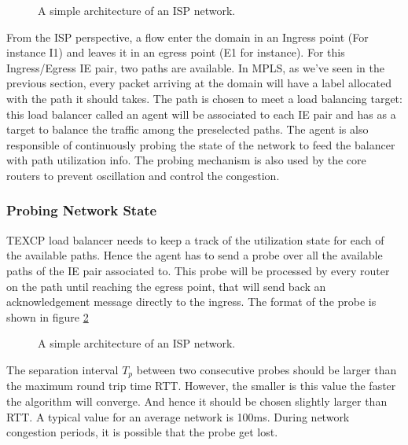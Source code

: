 \begin{figure}[h]
\begin{center}

\caption{
  A simple architecture of an ISP network.
  \label{fig:texcp1}
}
\end{center}
\end{figure}

From the ISP perspective, a flow enter the domain in an Ingress point (For instance I1) and leaves it in an egress point (E1 for instance). For this Ingress/Egress IE pair, two paths are available. In MPLS, as we've seen in the previous section, every packet arriving at the  domain will have a label allocated with the path it should takes. The path is chosen to meet a load balancing target: this load balancer called an agent will be associated to each IE pair and has as a target to balance the traffic among the preselected paths. The agent is also responsible of continuously probing the state of the network to feed the balancer with path utilization info. The probing mechanism is also used by the core routers to prevent oscillation and control the congestion.

\subsubsection{Probing Network State}
TEXCP load balancer needs to keep a track of the utilization state for each of the available paths. Hence the agent has to send a probe over all the available paths of  the IE pair associated to.  This probe will be processed by every router on the path until reaching the egress point, that will send back an acknowledgement message directly to the ingress. The format of the probe is shown in figure \ref{fig:texcp2}

\begin{figure}[h]
\begin{center}
\caption{
  A simple architecture of an ISP network.
  \label{fig:texcp2}
}
\end{center}
\end{figure}

The separation interval $T_p$ between two consecutive probes should be larger than the maximum round trip time RTT. However, the smaller is this value the faster the algorithm will converge. And hence it should be chosen slightly larger than RTT. A typical value for an average network is 100ms. During network congestion periods, it is possible that the probe get lost.

